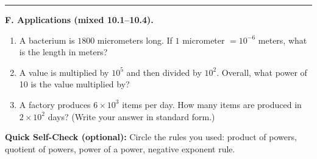 \documentclass[11pt]{article}
\begin{document}
\vspace{0.3em}
\hrule
\vspace{0.8em}

\textbf{F. Applications (mixed 10.1--10.4).}

\begin{enumerate}[label=\arabic*., resume]
\item A bacterium is $1800$ micrometers long. If $1$ micrometer $=10^{-6}$ meters, what is the length in meters?

\item A value is multiplied by $10^5$ and then divided by $10^2$. Overall, what power of 10 is the value multiplied by?

\item A factory produces $6\times10^3$ items per day. How many items are produced in $2\times10^2$ days? (Write your answer in standard form.)
\end{enumerate}

\vspace{0.6em}
\textbf{Quick Self-Check (optional):} Circle the rules you used: product of powers, quotient of powers, power of a power, negative exponent rule.
\end{document}
